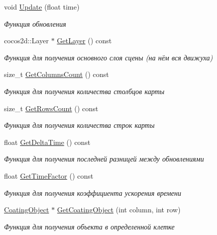 \begin{DoxyCompactItemize}
void \hyperlink{classrtm_1_1_world_controller_a6b97a9ccc241734be2d68198de15068f}{Update} (float time)
\begin{DoxyCompactList}\small\item\em Функция обновления \end{DoxyCompactList}\item 
cocos2d\+::\+Layer $\ast$ \hyperlink{classrtm_1_1_world_controller_a74bfc6a22a7091dc2668b08cd79f8aca}{Get\+Layer} () const
\begin{DoxyCompactList}\small\item\em Функция для получения основного слоя сцены (на нём вся движуха) \end{DoxyCompactList}\item 
size\+\_\+t \hyperlink{classrtm_1_1_world_controller_af845be3c9945c0a2250f32e134a04294}{Get\+Columns\+Count} () const
\begin{DoxyCompactList}\small\item\em Функция для получения количества столбцов карты \end{DoxyCompactList}\item 
size\+\_\+t \hyperlink{classrtm_1_1_world_controller_afb245167ac0680db01a3d09f80051dd0}{Get\+Rows\+Count} () const
\begin{DoxyCompactList}\small\item\em Функция для получения количества строк карты \end{DoxyCompactList}\item 
float \hyperlink{classrtm_1_1_world_controller_a2288dd191a28070d4811897281413c36}{Get\+Delta\+Time} () const
\begin{DoxyCompactList}\small\item\em Функция для получения последней разницей между обновлениями \end{DoxyCompactList}\item 
float \hyperlink{classrtm_1_1_world_controller_a97ccb5133bc7c0617affe4d947265370}{Get\+Time\+Factor} () const
\begin{DoxyCompactList}\small\item\em Функция для получения коэффициента ускорения времени \end{DoxyCompactList}\item 
\hyperlink{classrtm_1_1_coating_object}{Coating\+Object} $\ast$ \hyperlink{classrtm_1_1_world_controller_ab2b9d9d1451820fcbbe7107deed6e4cf}{Get\+Coating\+Object} (int column, int row)
\begin{DoxyCompactList}\small\item\em Функция для получения объекта в определенной клетке \end{DoxyCompactList}\item 

\end{DoxyCompactItemize}

